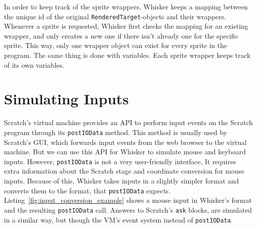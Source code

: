 In order to keep track of the sprite wrappers,
Whisker keeps a mapping between the unique id of the original \texttt{RenderedTarget}-objects and their wrappers.
Whenever a sprite is requested, Whisker first checks the mapping for an existing wrapper,
and only creates a new one if there isn't already one for the specific sprite.
This way, only one wrapper object can exist for every sprite in the program.
The same thing is done with variables.
Each sprite wrapper keeps track of its own variables.

\section{Simulating Inputs}


Scratch's virtual machine provides an API to perform input events on the Scratch program through its \texttt{postIOData} method.
This method is usually used by Scratch's GUI, which forwards input events from the web browser to the virtual machine.
But we can use this API for Whisker to simulate mouse and keyboard inputs.
However, \texttt{postIOData} is not a very user-friendly interface,
It requires extra information about the Scratch stage and coordinate conversion for mouse inputs.
Because of this, Whisker takes inputs in a slightly simpler format and converts them to the format, that \texttt{postIOData} expects.
Listing~\ref{fig:input_conversion_example} shows a mouse input in Whisker's format and the resulting \texttt{postIOData} call.
Answers to Scratch's \texttt{ask} blocks, are simulated in a similar way, but though the VM's event system instead of \texttt{postIOData}.
\parspace

